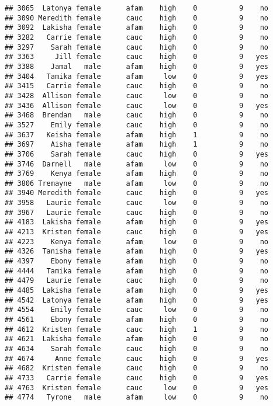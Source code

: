 \documentclass[
]{article}
\begin{document}
\begin{verbatim}
## 3065  Latonya female      afam    high    0          9    no
## 3090 Meredith female      cauc    high    0          9    no
## 3092  Lakisha female      afam    high    0          9    no
## 3282   Carrie female      cauc    high    0          9    no
## 3297    Sarah female      cauc    high    0          9    no
## 3363     Jill female      cauc    high    0          9   yes
## 3388    Jamal   male      afam    high    0          9   yes
## 3404   Tamika female      afam     low    0          9   yes
## 3415   Carrie female      cauc    high    0          9    no
## 3428  Allison female      cauc     low    0          9    no
## 3436  Allison female      cauc     low    0          9   yes
## 3468  Brendan   male      cauc    high    0          9    no
## 3527    Emily female      cauc    high    0          9    no
## 3637   Keisha female      afam    high    1          9    no
## 3697    Aisha female      afam    high    1          9    no
## 3706    Sarah female      cauc    high    0          9   yes
## 3746  Darnell   male      afam     low    0          9    no
## 3769    Kenya female      afam    high    0          9    no
## 3806 Tremayne   male      afam     low    0          9    no
## 3940 Meredith female      cauc    high    0          9   yes
## 3958   Laurie female      cauc     low    0          9    no
## 3967   Laurie female      cauc    high    0          9    no
## 4183  Lakisha female      afam    high    0          9   yes
## 4213  Kristen female      cauc    high    0          9   yes
## 4223    Kenya female      afam     low    0          9    no
## 4326  Tanisha female      afam    high    0          9   yes
## 4397    Ebony female      afam    high    0          9    no
## 4444   Tamika female      afam    high    0          9    no
## 4479   Laurie female      cauc    high    0          9    no
## 4485  Lakisha female      afam    high    0          9   yes
## 4542  Latonya female      afam    high    0          9   yes
## 4554    Emily female      cauc     low    0          9    no
## 4561    Ebony female      afam    high    0          9    no
## 4612  Kristen female      cauc    high    1          9    no
## 4621  Lakisha female      afam    high    0          9    no
## 4634    Sarah female      cauc    high    0          9    no
## 4674     Anne female      cauc    high    0          9   yes
## 4682  Kristen female      cauc    high    0          9    no
## 4733   Carrie female      cauc    high    0          9   yes
## 4763  Kristen female      cauc     low    0          9   yes
## 4774   Tyrone   male      afam     low    0          9    no

\end{verbatim}
\end{document}
